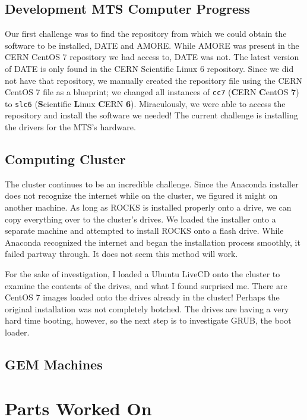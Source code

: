 \documentclass[12pt]{article}
\newcommand\tab[1][1cm]{\hspace*{#1}}
\begin{document}
\subsection{Development MTS Computer Progress}

\tab Our first challenge was to find the repository from which we could obtain
the software to be installed, DATE and AMORE. While AMORE was present in the
CERN CentOS 7 repository we had access to, DATE was not. The latest version of
DATE is only found in the CERN Scientific Linux 6 repository. Since we did not
have that repository, we manually created the repository file using the CERN
CentOS 7 file as a blueprint; we changed all instances of {\tt cc7}
(\textbf{C}ERN \textbf{C}entOS \textbf{7}) to {\tt slc6} (\textbf{S}cientific
\textbf{L}inux \textbf{C}ERN \textbf{6}). Miraculously, we were able to access
the repository and install the software we needed! The current challenge is
installing the drivers for the MTS's hardware.

\subsection{Computing Cluster}

\tab The cluster continues to be an incredible challenge. Since the Anaconda
installer does not recognize the internet while on the cluster, we figured it
might on another machine. As long as ROCKS is installed properly onto a drive,
we can copy everything over to the cluster's drives. We loaded the installer
onto a separate machine and attempted to install ROCKS onto a flash drive. While
Anaconda recognized the internet and began the installation process smoothly, it
failed partway through. It does not seem this method will work.

\tab For the sake of investigation, I loaded a Ubuntu LiveCD onto the cluster to
examine the contents of the drives, and what I found surprised me. There are
CentOS 7 images loaded onto the drives already in the cluster! Perhaps the
original installation was not completely botched. The drives are having a very
hard time booting, however, so the next step is to investigate GRUB, the boot
loader.

\subsection{GEM Machines}

\tab 

\section{Parts Worked On}
\end{document}
